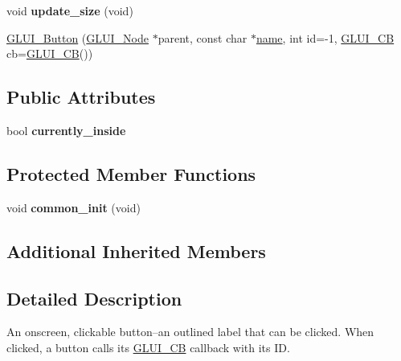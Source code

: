 \begin{DoxyCompactItemize}
\item 
\hypertarget{class_g_l_u_i___button_a374f9334b7a026ba6e63d4911039d456}{void {\bfseries update\+\_\+size} (void)}\label{class_g_l_u_i___button_a374f9334b7a026ba6e63d4911039d456}

\item 
\hyperlink{class_g_l_u_i___button_ab7ddf8c8d6c6c3dcab55b1738b1e7b8d}{G\+L\+U\+I\+\_\+\+Button} (\hyperlink{class_g_l_u_i___node}{G\+L\+U\+I\+\_\+\+Node} $\ast$parent, const char $\ast$\hyperlink{class_g_l_u_i___control_aa95b97d50df45335fc33f0af03958eb3}{name}, int id=-\/1, \hyperlink{class_g_l_u_i___c_b}{G\+L\+U\+I\+\_\+\+C\+B} cb=\hyperlink{class_g_l_u_i___c_b}{G\+L\+U\+I\+\_\+\+C\+B}())
\end{DoxyCompactItemize}
\subsection*{Public Attributes}
\begin{DoxyCompactItemize}
\item 
\hypertarget{class_g_l_u_i___button_aa7267a5e210893367862d9d96888eb41}{bool {\bfseries currently\+\_\+inside}}\label{class_g_l_u_i___button_aa7267a5e210893367862d9d96888eb41}

\end{DoxyCompactItemize}
\subsection*{Protected Member Functions}
\begin{DoxyCompactItemize}
\item 
\hypertarget{class_g_l_u_i___button_ac840fd31bb87ab5c4448f772759cf1b6}{void {\bfseries common\+\_\+init} (void)}\label{class_g_l_u_i___button_ac840fd31bb87ab5c4448f772759cf1b6}

\end{DoxyCompactItemize}
\subsection*{Additional Inherited Members}


\subsection{Detailed Description}
An onscreen, clickable button--an outlined label that can be clicked. When clicked, a button calls its \hyperlink{class_g_l_u_i___c_b}{G\+L\+U\+I\+\_\+\+C\+B} callback with its I\+D. 

